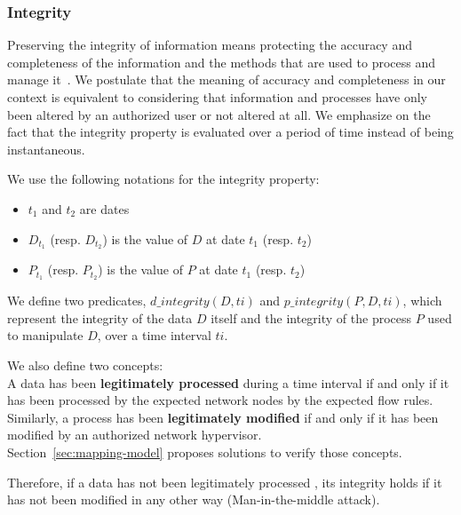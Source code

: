 \subsubsection{Integrity}
\label{sec:prop-int}
Preserving the integrity of information means protecting the accuracy and completeness of the information and the methods that are used to process and manage it~\cite{ISO/IEC270012013}.
We postulate that the meaning of accuracy and completeness in our context is equivalent to considering that information and processes have only been altered by an authorized user or not altered at all.
We emphasize on the fact that the integrity property is evaluated over a period of time instead of being instantaneous.

We use the following notations for the integrity property:

\begin{itemize}
    \item $t_1$ and $t_2$ are dates
    \item $D_{t_1}$ (resp. $D_{t_2}$) is the value of $D$ at date $t_1$ (resp. $t_2$)
    \item $P_{t_1}$ (resp. $P_{t_2}$) is the value of $P$ at date $t_1$ (resp. $t_2$)
\end{itemize}

We define two predicates, $d\_integrity(D,ti)$ and $p\_integrity(P,D,ti)$, which represent  the integrity of the data $D$ itself and the integrity of the process $P$ used to manipulate $D$, over a time interval $ti$. 

We also define two concepts:\\
A data has been \textbf{legitimately processed} during a time interval if and only if it has been processed by the expected network nodes by the expected flow rules.\\
Similarly, a process has been \textbf{legitimately modified} if and only if it has been modified by an authorized network hypervisor.\\
Section~\ref{sec:mapping-model} proposes solutions to verify those concepts.

Therefore, if a data has not been legitimately processed , its integrity holds if it has not been modified in any other way (\eg Man-in-the-middle attack). 

